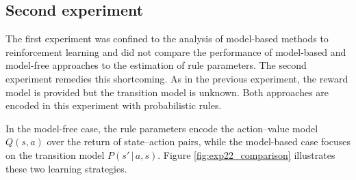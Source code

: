 \subsection{Second experiment}
\label{rrlearning-exp22}

The first experiment was confined to the analysis of model-based methods to reinforcement learning and did not compare the performance of model-based and model-free approaches to the estimation of rule parameters.  The second experiment remedies this shortcoming. As in the previous experiment, the reward model is provided but the transition model is unknown.  Both approaches are encoded in this experiment with probabilistic rules.

In the model-free case, the rule parameters encode the action--value model $Q(s,a)$ over the return of state--action pairs, while the model-based case focuses on the transition model $P(s'\, | \, a,s)$.  Figure \ref{fig:exp22_comparison} illustrates these two learning strategies.  

